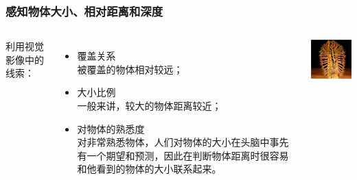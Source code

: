 \documentclass{beamer}
\begin{document}
\begin{frame}
	\frametitle{感知物体大小、相对距离和深度}
	\beamertemplatetransparentcovereddynamicmedium
	\begin{columns}
	\column{5cm}
	利用视觉影像中的线索：
	\begin{itemize}
		\item<1-> 覆盖关系\\{\tiny 被覆盖的物体相对较远；}
		\item<2-> 大小比例\\{\tiny 一般来讲，较大的物体距离较近；}
		\item<3-> 对物体的熟悉度\\{\tiny 对非常熟悉物体，人们对物体的大小在头脑中事先有一个期望和预测，因此在判断物体距离时很容易和他看到的物体的大小联系起来。} 
	\end{itemize}
	\column{5cm}
	\begin{center}
		\includegraphics[width=4cm]{images/depth.jpg}
	\end{center}
	\end{columns}
\end{frame}
\end{document}
